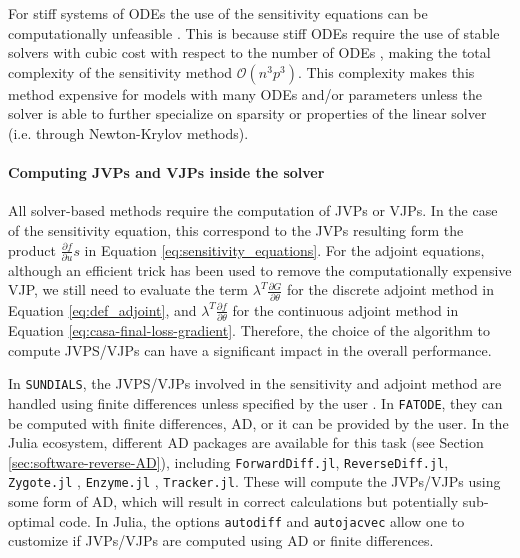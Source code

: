 For stiff systems of ODEs the use of the sensitivity equations can be computationally unfeasible \cite{kim_stiff_2021}.
This is because stiff ODEs require the use of stable solvers with cubic cost with respect to the number of ODEs \cite{hairer-solving-2}, making the total complexity of the sensitivity method $\mathcal{O}(n^3p^3)$. 
This complexity makes this method expensive for models with many ODEs and/or parameters unless the solver is able to further specialize on sparsity or properties of the linear solver (i.e. through Newton-Krylov methods). 

\paragraph{Computing JVPs and VJPs inside the solver}
\label{section:computing-vjp-inside-solver}

All solver-based methods require the computation of JVPs or VJPs. 
In the case of the sensitivity equation, this correspond to the JVPs resulting form the product $\frac{\partial f}{\partial u} s $ in Equation \eqref{eq:sensitivity_equations}.
For the adjoint equations, although an efficient trick has been used to remove the computationally expensive VJP, we still need to evaluate the term $\lambda^T \frac{\partial G}{\partial \theta}$ for the discrete adjoint method in Equation \eqref{eq:def_adjoint}, and $\lambda^T \frac{\partial f}{\partial \theta}$ for the continuous adjoint method in Equation \eqref{eq:casa-final-loss-gradient}. 
Therefore, the choice of the algorithm to compute JVPS/VJPs can have a significant impact in the overall performance. 

In \texttt{SUNDIALS}, the JVPS/VJPs involved in the sensitivity and adjoint method are handled using finite differences unless specified by the user \cite{SUNDIALS-hindmarsh2005sundials}.
In \texttt{FATODE}, they can be computed with finite differences, AD, or it can be provided by the user.
In the Julia ecosystem, different AD packages are available for this task (see Section \ref{sec:software-reverse-AD}), including \texttt{ForwardDiff.jl}, \texttt{ReverseDiff.jl}, \texttt{Zygote.jl} \cite{Innes_Zygote}, \texttt{Enzyme.jl} \cite{moses_Enzyme}, \texttt{Tracker.jl}.
These will compute the JVPs/VJPs using some form of AD, which will result in correct calculations but potentially sub-optimal code. 
In Julia, the options \texttt{autodiff} and \texttt{autojacvec} allow one to customize if JVPs/VJPs are computed using AD or finite differences.  

